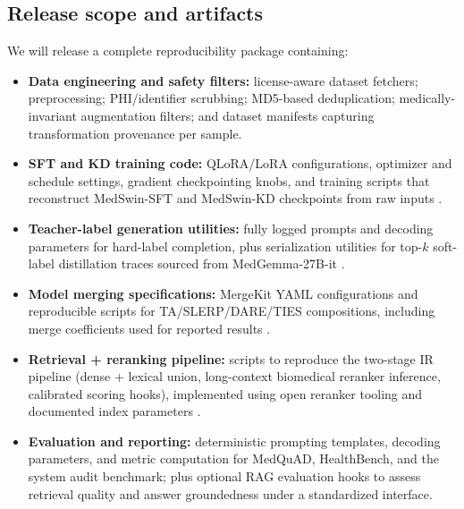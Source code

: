 \documentclass[conference]{IEEEtran}
\begin{document}
\subsection{Release scope and artifacts}
We will release a complete reproducibility package containing:
\begin{itemize}
    \item \textbf{Data engineering and safety filters:} license-aware dataset fetchers; preprocessing; PHI/identifier scrubbing; MD5-based deduplication; medically-invariant augmentation filters; and dataset manifests capturing transformation provenance per sample.
    \item \textbf{SFT and KD training code:} QLoRA/LoRA configurations, optimizer and schedule settings, gradient checkpointing knobs, and training scripts that reconstruct MedSwin-SFT and MedSwin-KD checkpoints from raw inputs \cite{hu2021lora,dettmers2023qlora}.
    \item \textbf{Teacher-label generation utilities:} fully logged prompts and decoding parameters for hard-label completion, plus serialization utilities for top-$k$ soft-label distillation traces sourced from MedGemma-27B-it \cite{google2025medgemma,hinton2015distilling}.
    \item \textbf{Model merging specifications:} MergeKit YAML configurations and reproducible scripts for TA/SLERP/DARE/TIES compositions, including merge coefficients used for reported results \cite{goddard2024arcee,yadav2023ties,yu2023supermario,shoemake1985quaternion}.
    \item \textbf{Retrieval + reranking pipeline:} scripts to reproduce the two-stage IR pipeline (dense + lexical union, long-context biomedical reranker inference, calibrated scoring hooks), implemented using open reranker tooling and documented index parameters \cite{lewis2020rag,bgev2gemma,flagembedding}.
    \item \textbf{Evaluation and reporting:} deterministic prompting templates, decoding parameters, and metric computation for MedQuAD, HealthBench, and the system audit benchmark; plus optional RAG evaluation hooks to assess retrieval quality and answer groundedness under a standardized interface.
\end{itemize}
\end{document}
